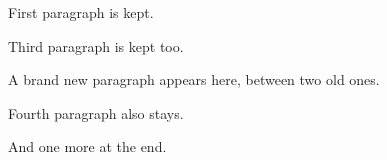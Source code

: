 \documentclass{article}
\begin{document}
First paragraph is kept.

Third paragraph is kept too.

A brand new paragraph appears here, between two old ones.

Fourth paragraph also stays.

And one more at the end.
\end{document}
